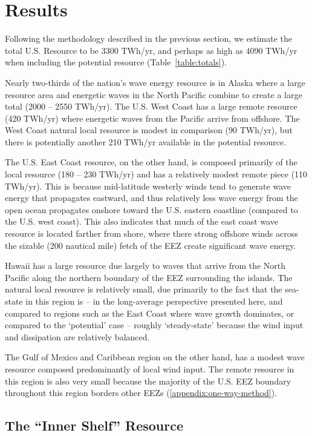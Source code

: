 \section{Results}
\label{sec:results}

Following the methodology described in the previous section, we estimate the total U.S. Resource to be 3300 TWh/yr, and perhaps as high as 4090 TWh/yr when including the potential resource (Table~\ref{table:totals}).

Nearly two-thirds of the nation's wave energy resource is in Alaska where a large resource area and energetic waves in the North Pacific combine to create a large total (2000 – 2550 TWh/yr). The U.S. West Coast has a large remote resource (420 TWh/yr) where energetic waves from the Pacific arrive from offshore.  The West Coast natural local resource is modest in comparison (90 TWh/yr), but there is potentially another 210 TWh/yr available in the potential resource.

The U.S. East Coast resource, on the other hand, is composed primarily of the local resource (180 – 230 TWh/yr) and has a relatively modest remote piece (110 TWh/yr). This is because mid-latitude westerly winds tend to generate wave energy that propagates eastward, and thus relatively less wave energy from the open ocean propagates onshore toward the U.S. eastern coastline (compared to the U.S. west coast). This also indicates that much of the east coast wave resource is located farther from shore, where there strong offshore winds across the sizable (200 nautical mile) fetch of the EEZ create significant wave energy.

Hawaii has a large resource due largely to waves that arrive from the North Pacific along the northern boundary of the EEZ surrounding the islands. The natural local resource is relatively small, due primarily to the fact that the sea-state in this region is -- in the long-average perspective presented here, and compared to regions such as the East Coast where wave growth dominates, or compared to the `potential' case -- roughly `steady-state' because the wind input and dissipation are relatively balanced.

The Gulf of Mexico and Caribbean region on the other hand, has a modest wave resource composed predominantly of local wind input. The remote resource in this region is also very small because the majority of the U.S. EEZ boundary throughout this region borders other EEZs (\ref{appendix:one-way-method}).

\subsection{The ``Inner Shelf'' Resource}


